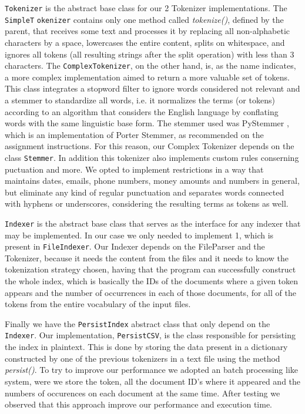 \documentclass[12pt]{article}
\begin{document}
\newpage
\texttt{Tokenizer} is the abstract base class for our 2 Tokenizer 
implementations.
The \texttt{SimpleT} \texttt{okenizer} contains only one method called 
{\it tokenize()\/}, defined by the parent, that receives some text and processes it by replacing all non-alphabetic 
characters by a space, lowercases the entire content, splits on whitespace, 
and ignores all tokens (all resulting strings after the split operation) with 
less than 3 characters.
The \texttt{ComplexTokenizer}, on the other hand, is, as the name indicates, a
more complex implementation aimed to return a more valuable set of tokens.
This class integrates a stopword filter to ignore words considered not relevant
and a stemmer to standardize all words, i.e. it normalizes the terms (or tokens)
according to an algorithm that considers the English language by conflating
words with the same linguistic base form.
The stemmer used was PyStemmer \cite{pystemmer}, which is an implementation of 
Porter Stemmer, as recommended on the assignment instructions. 
For this reason, our Complex Tokenizer depends on the class \texttt{Stemmer}.
In addition this tokenizer also implements custom rules conserning puctuation
and more.
We opted to implement restrictions in a way that maintains dates, emails, phone
numbers, money amounts and numbers in general, but eliminate any kind of 
regular punctuation and separates words connected with hyphens or underscores,
considering the resulting terms as tokens as well.

\texttt{Indexer} is the abstract base class that serves as the interface for any
indexer that may be implemented. In our case we only needed to implement 1, 
which is present in \texttt{FileIndexer}. 
Our Indexer depends on the FileParser and the Tokenizer, because it needs the 
content from the files and it needs to know the tokenization strategy chosen,
having that the program can successfully construct the whole index, which is
basically the IDs of the documents where a given token appears and the number 
of occurrences in each of those documents, for all of the tokens from the 
entire vocabulary of the input files.

Finally we have the \texttt{PersistIndex} abstract class that only depend on 
the \texttt{Indexer}.
Our implementation, \texttt{PersistCSV}, is the class responsible for 
persisting the index in plaintext.
This is done by storing the data present in a dictionary constructed by one 
of the previous tokenizers in a text file using the method {\it persist()\/}. 
To try to improve our performance we adopted an batch processing like system, 
were we store the token, all the document ID's where it appeared and the 
numbers of occurences on each document at the same time. 
After testing we observed that this approach improve our performance and 
execution time.
\end{document}
